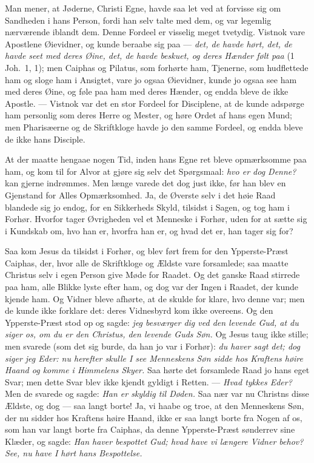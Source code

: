 \documentclass[12pt,a4paper]{book}
\begin{document}
Man mener, at Jøderne, Christi Egne, havde saa let ved at forvisse sig om
Sandheden i hans Person, fordi han selv talte med dem, og var legemlig nærværende
iblandt dem. Denne Fordeel er visselig meget tvetydig. Vistnok vare Apostlene
Øievidner, og kunde beraabe sig paa --- \emph{det, de havde hørt, det, de havde
seet med deres Øine, det, de havde beskuet, og deres Hænder følt paa} (1 Joh.\ 1,
1); men Caiphas og Pilatus, som forhørte ham, Tjenerne, som hudflettede ham og
sloge ham i Ansigtet, vare jo ogsaa Øievidner, kunde jo ogsaa see ham med deres
Øine, og føle paa ham med deres Hænder, og endda bleve de ikke Apostle. ---
Vistnok var det en stor Fordeel for Disciplene, at de kunde adspørge ham
personlig som deres Herre og Mester, og høre Ordet af hans egen Mund; men
Pharisæerne og de Skriftkloge havde jo den samme Fordeel, og endda bleve de ikke
hans Disciple.

At der maatte hengaae nogen Tid, inden hans Egne ret bleve opmærksomme paa ham,
og kom til for Alvor at gjøre sig selv det Spørgsmaal: \emph{hvo er dog Denne?}
kan gjerne indrømmes. Men længe varede det dog just ikke, før han blev en
Gjenstand for Alles Opmærksomhed. Ja, de Øverste selv i det høie Raad blandede
sig jo endog, for en Sikkerheds Skyld, tilsidst i Sagen, og tog ham i Forhør.
Hvorfor tager Øvrigheden vel et Menneske i Forhør, uden for at sætte sig i
Kundskab om, hvo han er, hvorfra han er, og hvad det er, han tager sig for?

Saa kom Jesus da tilsidst i Forhør, og blev ført frem for den Ypperste-Præst
Caiphas, der, hvor alle de Skriftkloge og Ældste vare forsamlede; saa maatte
Christus selv i egen Person give Møde for Raadet. Og det ganske Raad stirrede paa
ham, alle Blikke lyste efter ham, og dog var der Ingen i Raadet, der kunde kjende
ham. Og Vidner bleve afhørte, at de skulde for\-%
klare, hvo denne var; men de kunde ikke forklare det: deres Vidnesbyrd kom ikke
overeens. Og den Ypperste-Præst stod op og sagde: \emph{jeg besværger dig ved den
levende Gud, at du siger os, om du er den Christus, den levende Guds Søn.} Og
Jesus taug ikke stille; men svarede (som det sig burde, da han jo var i Forhør):
\emph{du haver sagt det; dog siger jeg Eder: nu herefter skulle I see Menneskens
Søn sidde hos Kraftens høire Haand og komme i Himmelens Skyer.} Saa hørte det
forsamlede Raad jo hans eget Svar; men dette Svar blev ikke kjendt gyldigt i
Retten. --- \emph{Hvad tykkes Eder?} Men de svarede og sagde: \emph{Han er
%
skyldig til Døden.} Saa nær var nu Christns disse Ældste, og dog --- saa langt
borte! Ja, vi haabe og troe, at den Menneskens Søn, der nu sidder hos Kraftens
høire Haand, ikke er saa langt borte fra Nogen af os, som han var langt borte fra
Caiphas, da denne Ypperste-Præst sønderrev sine Klæder, og sagde: \emph{Han haver
bespottet Gud; hvad have vi længere Vidner behov? See, nu have I hørt hans
Bespottelse.}
\end{document}
